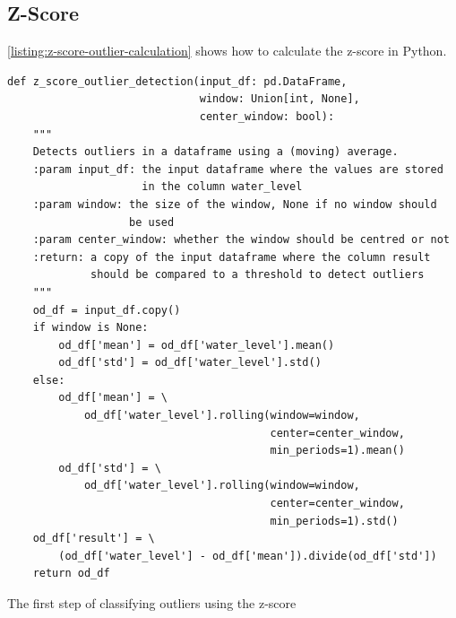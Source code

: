 \subsection{Z-Score}
\autoref{listing:z-score-outlier-calculation} shows how to calculate the z-score in Python.
\begin{listing}
\begin{verbatim}
def z_score_outlier_detection(input_df: pd.DataFrame,
                              window: Union[int, None],
                              center_window: bool):
    """
    Detects outliers in a dataframe using a (moving) average.
    :param input_df: the input dataframe where the values are stored
                     in the column water_level
    :param window: the size of the window, None if no window should
                   be used
    :param center_window: whether the window should be centred or not
    :return: a copy of the input dataframe where the column result
             should be compared to a threshold to detect outliers
    """
    od_df = input_df.copy()
    if window is None:
        od_df['mean'] = od_df['water_level'].mean()
        od_df['std'] = od_df['water_level'].std()
    else:
        od_df['mean'] = \
            od_df['water_level'].rolling(window=window,
                                         center=center_window,
                                         min_periods=1).mean()
        od_df['std'] = \
            od_df['water_level'].rolling(window=window,
                                         center=center_window,
                                         min_periods=1).std()
    od_df['result'] = \
        (od_df['water_level'] - od_df['mean']).divide(od_df['std'])
    return od_df
\end{verbatim}
\caption{The first step of classifying outliers using the z-score}
\label{listing:z-score-outlier-calculation}
\end{listing}

